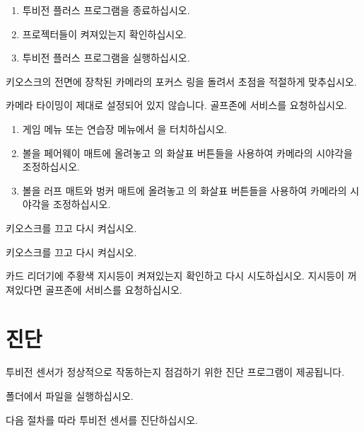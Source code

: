 \documentclass[10pt, openright, language=korean]{hzguide}
\begin{document}
\begin{enumerate}
\item 투비전 플러스 프로그램을 종료하십시오.
\item 프로젝터들이 켜져있는지 확인하십시오.
\item 투비전 플러스 프로그램을 실행하십시오.
\end{enumerate}

키오스크의 전면에 장착된 카메라의 포커스 링을 돌려서 초점을 적절하게 맞추십시오.

카메라 타이밍이 제대로 설정되어 있지 않습니다. 골프존에 서비스를 요청하십시오.


\begin{enumerate}
\item 게임 메뉴 또는 연습장 메뉴에서 을 터치하십시오.
\item 볼을 페어웨이 매트에 올려놓고 의 화살표 버튼들을 사용하여 카메라의 시야각을 조정하십시오.
\item 볼을 러프 매트와 벙커 매트에 올려놓고 의 화살표 버튼들을 사용하여 카메라의 시야각을 조정하십시오.
\end{enumerate}

키오스크를 끄고 다시 켜십시오.

키오스크를 끄고 다시 켜십시오.

카드 리더기에 주황색 지시등이 켜져있는지 확인하고 다시 시도하십시오. 
지시등이 꺼져있다면 골프존에 서비스를 요청하십시오.

\newpage
\section{진단}

투비전 센서가 정상적으로 작동하는지 점검하기 위한 진단 프로그램이 제공됩니다. 

\begin{flushleft}
 폴더에서  파일을 실행하십시오.
\end{flushleft}


다음 절차를 따라 투비전 센서를 진단하십시오.
\end{document}
